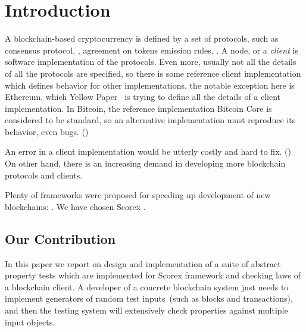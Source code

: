 
\section{Introduction}

A blockchain-based cryptocurrency is defined by a set of protocols, such as consensus protocol, , agreement on tokens emission rules, . A node, or a {\em client} is software implementation of the protocols. Even more, usually not all the details of all the protocols are specified, so there is some reference client implementation which defines behavior for other implementations. the notable exception here is Ethereum, which Yellow Paper~\cite{ethyp} is trying to define all the details of a client implementation. In Bitcoin, the reference implementation Bitcoin Core is considered to be standard, so an alternative implementation must reproduce its behavior, even bugs. ()

An error in a client implementation would be utterly costly and hard to fix. () On other hand, there is an increasing demand in developing more blockchain protocols and clients. 

Plenty of frameworks were proposed for speeding up development of new blockchains: . We have chosen Scorex .

\subsection{Our Contribution}

In this paper we report on design and implementation of a suite of abstract property tests which are implemented for Scorex framework and checking laws of a blockchain client. A developer of a concrete blockchain system just needs to implement generators of random test inputs~(such as blocks and transactions), and then the testing system will extensively check properties against multiple input objects.
